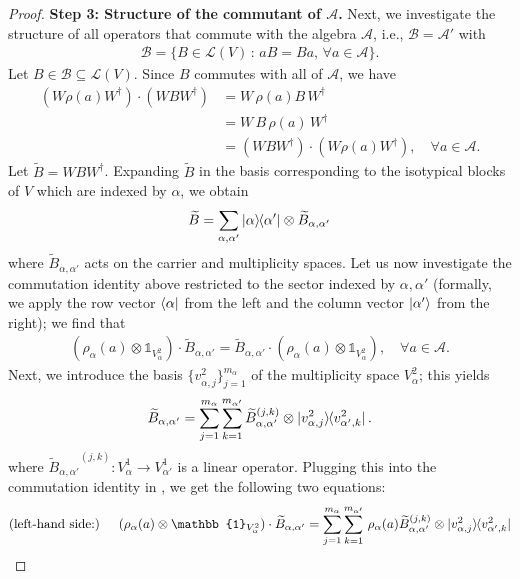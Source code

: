 \begin{proof}
\textbf{Step 3: Structure of the commutant of $\mathcal{A}$.} Next, we investigate the structure of all operators that commute with the algebra $\mathcal{A}$, i.e., $\mathcal{B} = \mathcal{A}'$ with
\begin{align}
\mathcal{B} = \{B \in \mathcal{L}(V) \, : \, aB=Ba, \, \forall a \in \mathcal{A}\}.    
\end{align}
Let $B \in \mathcal{B} \subseteq \mathcal{L}(V)$. Since $B$ commutes with all of $\mathcal{A}$, we have
\begin{align}
(W \rho(a) W^\dag)\cdot(W B W^\dag) &= 
W \, \rho(a) B  \, W^\dag\\
&= 
W \, B \,\rho(a) \, W^\dag\\
&=(W B W^\dag) \cdot (W \rho(a) W^\dag), \quad \forall a \in \mathcal{A}.  
\end{align}
Let $\widetilde{B} = W B W^\dag$. Expanding $\widetilde{B}$ in the basis corresponding to the isotypical blocks of $V$ which are indexed by $\alpha$, we obtain
$$
\widetilde{B} = \sum_{\alpha,\alpha'} \ket{\alpha}\hspace{-1mm}\bra{\alpha'} \otimes \widetilde{B}_{\alpha,\alpha'}
$$
where $\widetilde{B}_{\alpha,\alpha'}$ acts on the carrier and multiplicity spaces. Let us now investigate the commutation identity above restricted to the sector indexed by $\alpha,\alpha'$ (formally, we apply the row vector $\bra{\alpha}$ from the left and the column vector $\ket{\alpha'}$ from the right); we find that
\begin{align}\label{eq:comm-id}
(\rho_{\alpha}(a) \otimes \mathbb{1}_{V_\alpha^2}) \cdot \widetilde{B}_{\alpha,\alpha'} = \widetilde{B}_{\alpha,\alpha'} \cdot (\rho_{\alpha}(a) \otimes \mathbb{1}_{V_\alpha^2}), \quad \forall a \in \mathcal{A}.
\end{align}
Next, we introduce the basis $\{v_{\alpha,j}^2\}_{j=1}^{m_\alpha}$ of the multiplicity space $V_\alpha^2$; this yields
\begin{align}
\widetilde{B}_{\alpha,\alpha'} = \sum_{j=1}^{m_\alpha} \sum_{k=1}^{m_{\alpha'}}   {\widetilde{B}_{\alpha,\alpha'}}^{(j,k)} \otimes \ket{v_{\alpha,j}^2} \hspace{-1mm}\bra{v_{\alpha',k}^2}.
\end{align}
where ${\widetilde{B}_{\alpha,\alpha'}}^{(j,k)}:V_\alpha^1 \rightarrow V_{\alpha'}^1$ is a linear operator. Plugging this into the commutation identity in , we get the following two equations:
\begin{align*}
\text{(left-hand side:) }  \quad (\rho_{\alpha}(a) \otimes \mathbb{1}_{V_\alpha^2}) \cdot \widetilde{B}_{\alpha,\alpha'} &= \sum_{j=1}^{m_\alpha} \sum_{k=1}^{m_{\alpha'}} \,  \rho_\alpha(a) {\widetilde{B}_{\alpha,\alpha'}}^{(j,k)} \otimes \ket{v_{\alpha,j}^2} \hspace{-1mm}\bra{v_{\alpha',k}^2}   \\

\end{align*}
\end{proof}
